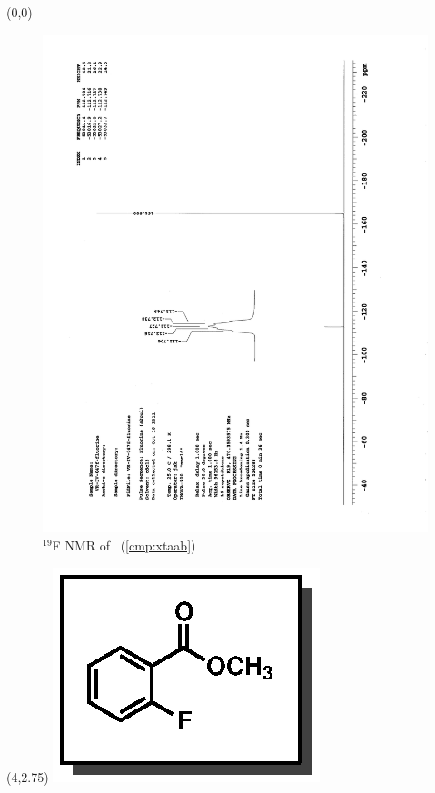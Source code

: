 \clearpage
\begin{textblock}{20}(0,0)
\begin{figure}[htb]
\caption{$^{19}$F NMR of  \CMPxtaab\ (\ref{cmp:xtaab})}
\includegraphics[scale=0.75, trim = 0mm 0mm 0mm 5mm,
clip]{chp_asymmetric/images/nmr/xtaabF}
\vspace{-100pt}
\end{figure}
\end{textblock}
\begin{textblock}{1}(4,2.75)
\includegraphics[scale=0.8, angle=90]{chp_asymmetric/images/xtaab}
\end{textblock}
\clearpage

